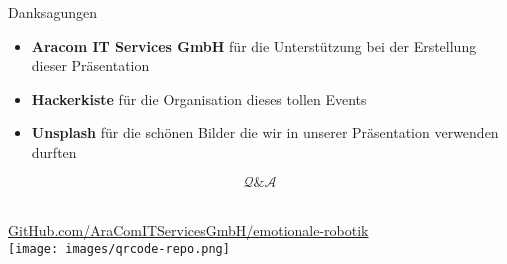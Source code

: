 \documentclass[aspectratio=169]{beamer}
\begin{document}
\begin{frame}{Danksagungen}
  \begin{itemize}
    \item \textbf{Aracom IT Services GmbH} für die Unterstützung bei der Erstellung dieser Präsentation
    \item \textbf{Hackerkiste} für die Organisation dieses tollen Events
    \item \textbf{Unsplash} für die schönen Bilder die wir in unserer Präsentation verwenden durften
  \end{itemize}
\end{frame}

\begin{frame}[c]{}
  \centering
  \begin{minipage}{\textwidth}
    \centering
    \Huge \[\mathcal Q \& \mathcal A\]
    \Large {}
  \end{minipage}
\end{frame}

\begin{frame}[c]{}
  \centering
  \begin{minipage}{\textwidth}
    \centering
    \Large {}\\
    \href{https://github.com/AraComITServicesGmbH/emotionale-robotik}{GitHub.com/AraComITServicesGmbH/emotionale-robotik}\\
    \vspace{.4cm}
    \texttt{[image: images/qrcode-repo.png]}
  \end{minipage}
\end{frame}
\end{document}
